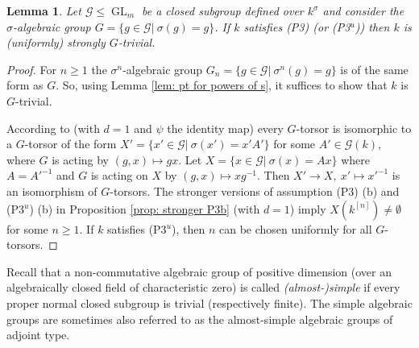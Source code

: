 \documentclass[oneside,reqno]{amsart}
\newtheorem{lemma}[theo]{Lemma}
\theoremstyle{definition}
\newcommand{\G}{\mathcal{G}}
\newcommand{\Gl}{\operatorname{GL}}
\newcommand{\s}{\sigma}
\newcommand{\kn}{k^{[n]}}
\newcommand{\pt}{{\rm{(P3$^u$)}}}
\newcommand{\ptweak}{{\rm{(P3)}}}
\begin{document}
\begin{lemma} \label{lemma: group of constants}
	Let $\G\leq \Gl_m$ be a closed subgroup defined over $k^\s$ and consider the $\s$-algebraic group $G=\{g\in\G|\ \s(g)=g\}$. If $k$ satisfies \ptweak{} (or \pt{}) then $k$ is (uniformly) strongly $G$-trivial.
\end{lemma}
\begin{proof}
	For $n\geq 1$ the $\s^n$-algebraic group $G_n=\{g\in\G|\ \s^n(g)=g\}$ is of the same form as $G$. So, using Lemma \ref{lem: pt for powers of s}, it suffices to show that $k$ is $G$-trivial. 
	
	According to \cite[Cor. 6.3]{BachmayrWibmer:TorsorsForDifferenceAlgebraicGroups} (with $d=1$ and $\psi$ the identity map) every $G$-torsor is isomorphic to a $G$-torsor of the form 
	$X'=\{x'\in\G|\ \s(x')=x'A'\}$
	for some $A'\in\G(k)$, where $G$ is acting by $(g,x)\mapsto gx$. Let $X=\{x\in\G|\ \s(x)=Ax\}$ where $A=A'^{-1}$ and $G$ is acting on $X$ by $(g,x)\mapsto xg^{-1}$. Then $X'\to X,\ x'\mapsto x'^{-1}$ is an isomorphism of $G$-torsors. The stronger versions of assumption \ptweak{} (b) and \pt{} (b) in Proposition \ref{prop: stronger P3b} (with $d=1$) imply $X(\kn)\neq\emptyset$ for some $n\geq 1$. If $k$ satisfies \pt{}, then $n$ can be chosen uniformly for all $G$-torsors.
\end{proof}

Recall that a non-commutative algebraic group of positive dimension (over an algebraically closed field of characteristic zero) is called \emph{(almost-)simple} if every proper normal closed subgroup is trivial (respectively finite). The simple algebraic groups are sometimes also referred to as the almost-simple algebraic groups of adjoint type. %
\end{document}
